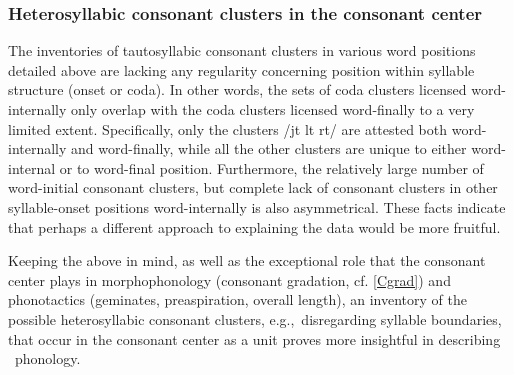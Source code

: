 \subsubsection[Heterosyllabic CCs in the consonant center]{Heterosyllabic consonant clusters in the consonant center}\label{consecutiveCs}
The inventories of tautosyllabic consonant clusters in various word positions detailed above are lacking any regularity concerning position within syllable structure (onset or coda). In other words, the sets of coda clusters licensed word-internally only overlap with the coda clusters licensed word-finally to a very limited extent. Specifically, only the clusters /jt lt rt/ are attested both word-internally and word-finally, while all the other clusters are unique to either word-internal or to word-final position. 
Furthermore, the relatively large number of word-initial consonant clusters, but complete lack of consonant clusters in other syllable-onset positions word-internally is also asymmetrical. 
These facts indicate that perhaps a different approach to explaining the data would be more fruitful. 

Keeping the above in mind, as well as the exceptional role that the consonant center plays in morphophonology (consonant gradation, cf. \SEC\ref{Cgrad}) and phonotactics (geminates, preaspiration, overall length), an inventory of the possible heterosyllabic consonant clusters, e.g.,~disregarding syllable boundaries, that occur in the consonant center as a unit proves more insightful in describing \PS\ phonology. 

